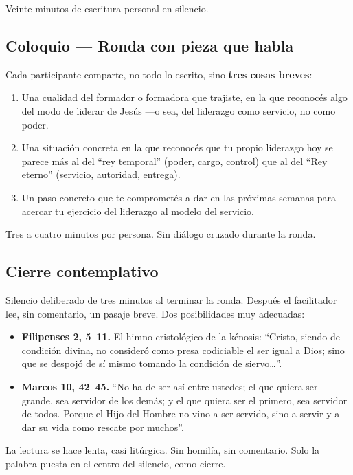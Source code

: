 \documentclass[11pt, a4paper]{article}
\begin{document}
\begin{actividad}
Veinte minutos de escritura personal en silencio.

\subsection*{Coloquio --- Ronda con pieza que habla}

Cada participante comparte, no todo lo escrito, sino \textbf{tres cosas breves}:

\begin{enumerate}[label={\arabic*.}]
  \item Una cualidad del formador o formadora que trajiste, en la que reconocés algo del modo de liderar de Jesús ---o sea, del liderazgo como servicio, no como poder.
  \item Una situación concreta en la que reconocés que tu propio liderazgo hoy se parece más al del ``rey temporal'' (poder, cargo, control) que al del ``Rey eterno'' (servicio, autoridad, entrega).
  \item Un paso concreto que te comprometés a dar en las próximas semanas para acercar tu ejercicio del liderazgo al modelo del servicio.
\end{enumerate}

Tres a cuatro minutos por persona. Sin diálogo cruzado durante la ronda.

\subsection*{Cierre contemplativo}

Silencio deliberado de tres minutos al terminar la ronda. Después el facilitador lee, sin comentario, un pasaje breve. Dos posibilidades muy adecuadas:

\begin{itemize}
  \item \textbf{Filipenses 2, 5--11.} El himno cristológico de la kénosis: ``Cristo, siendo de condición divina, no consideró como presa codiciable el ser igual a Dios; sino que se despojó de sí mismo tomando la condición de siervo\ldots''.
  \item \textbf{Marcos 10, 42--45.} ``No ha de ser así entre ustedes; el que quiera ser grande, sea servidor de los demás; y el que quiera ser el primero, sea servidor de todos. Porque el Hijo del Hombre no vino a ser servido, sino a servir y a dar su vida como rescate por muchos''.
\end{itemize}

La lectura se hace lenta, casi litúrgica. Sin homilía, sin comentario. Solo la palabra puesta en el centro del silencio, como cierre.


\end{actividad}
\end{document}

